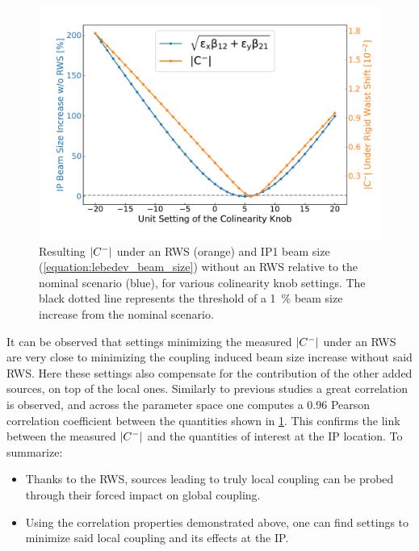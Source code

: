 \begin{figure}[!htb]
    \centering
    \includegraphics*[width=\textwidth]{Figures/IR_Coupling_Correction/full_scenario_cminus_and_ip_size.pdf}
    \caption{Resulting \(\left\lvert C^{-} \right\rvert\) under an RWS (\textcolor{mplorange}{orange}) and IP\num{1} beam size (\cref{equation:lebedev_beam_size}) without an RWS relative to the nominal scenario (\textcolor{mplblue}{blue}), for various colinearity knob settings. The black dotted line represents the threshold of a \qty{1}{\percent} beam size increase from the nominal scenario.}
    \label{figure:full_scenario_colin_correction_dqmin_lebedev}
\end{figure}

It can be observed that settings minimizing the measured \(\left\lvert C^{-} \right\rvert\) under an RWS are very close to minimizing the coupling induced beam size increase without said RWS.
Here these settings also compensate for the contribution of the other added sources, on top of the local ones.
Similarly to previous studies a great correlation is observed, and across the parameter space one computes a \num{0.96} Pearson correlation coefficient between the quantities shown in \cref{figure:full_scenario_colin_correction_dqmin_lebedev}.
This confirms the link between the measured \(\left\lvert C^{-} \right\rvert\) and the quantities of interest at the IP location.
To summarize:

\begin{itemize}
    \item Thanks to the RWS, sources leading to truly local coupling can be probed through their forced impact on global coupling.
    \item Using the correlation properties demonstrated above, one can find settings to minimize said local coupling and its effects at the IP.
\end{itemize}

